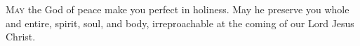 \lettrine[loversize=0.15,lines=2]{M}{ay} the God of peace make you perfect in holiness. May he preserve you whole and entire, spirit, soul, and body, irreproachable at the coming of our Lord Jesus Christ.
